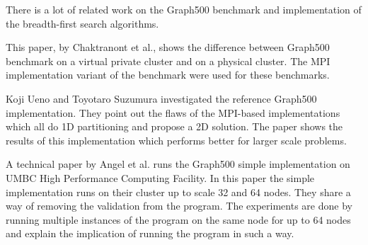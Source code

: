There is a lot of related work on the Graph500 benchmark and implementation of the breadth-first search algorithms. 

This paper, by Chaktranont et al.\cite{chakthranont2014exploring}, shows the difference between Graph500 benchmark on a virtual private cluster and on a physical cluster. The MPI implementation variant of the benchmark were used for these benchmarks.

Koji Ueno and Toyotaro Suzumura\cite{ueno2012highly} investigated the reference Graph500 implementation. They point out the flaws of the MPI-based implementations which all do 1D partitioning and propose a 2D solution. The paper shows the results of this implementation which performs better for larger scale problems.

A technical paper by Angel et al.\cite{angel2012graph} runs the Graph500 simple implementation on UMBC High Performance Computing Facility. In this paper the simple implementation runs on their cluster up to scale 32 and 64 nodes. They share a way of removing the validation from the program. The experiments are done by running multiple instances of the program on the same node for up to 64 nodes and explain the implication of running the program in such a way.